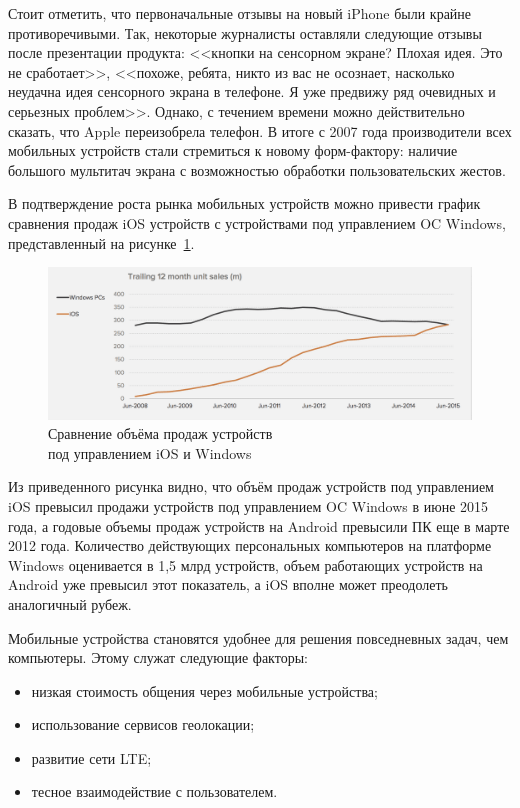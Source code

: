 Стоит отметить, что первоначальные отзывы на новый iPhone были крайне противоречивыми.
Так, некоторые журналисты оставляли следующие отзывы после презентации продукта:
<<кнопки на сенсорном экране? Плохая идея. Это не сработает>>,
<<похоже, ребята, никто из вас не осознает, насколько неудачна идея сенсорного
экрана в телефоне. Я уже предвижу ряд очевидных и серьезных проблем>>.
Однако, с течением времени можно действительно сказать, что Apple переизобрела телефон.
В итоге с 2007 года производители всех мобильных устройств
стали стремиться к новому форм-фактору: наличие большого мультитач экрана
с возможностью обработки пользовательских жестов.

В подтверждение роста рынка мобильных устройств можно привести график сравнения
продаж iOS устройств с устройствами под управлением OC Windows, представленный
на рисунке~\ref{fig:ios_windows_compare}.

\begin{figure}[h!]
  \centering
  \includegraphics[width=150mm]{fig/ios_windows_compare}
  \caption{Сравнение объёма продаж устройств \\ под управлением iOS и Windows}
  \label{fig:ios_windows_compare}
\end{figure}

Из приведенного рисунка видно, что объём продаж устройств под управлением
iOS превысил продажи устройств под управлением OC Windows в июне 2015 года, а
годовые объемы продаж устройств на Android превысили ПК еще в марте 2012 года.
Количество действующих персональных компьютеров на платформе Windows оценивается
в 1,5 млрд устройств, объем работающих устройств на Android уже превысил этот
показатель, а iOS вполне может преодолеть аналогичный рубеж.

Мобильные устройства становятся удобнее для решения повседневных задач,
чем компьютеры. Этому служат следующие факторы:
\begin{itemize}
  \item низкая стоимость общения через мобильные устройства;
  \item использование сервисов геолокации;
  \item развитие сети LTE;
  \item тесное взаимодействие с пользователем.
\end{itemize}

